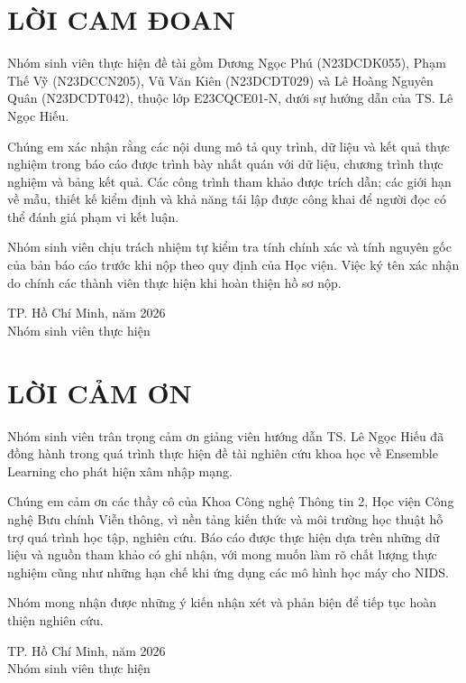 \chapter*{LỜI CAM ĐOAN}
Nhóm sinh viên thực hiện đề tài gồm Dương Ngọc Phú (N23DCDK055), Phạm Thế Vỹ (N23DCCN205), Vũ Văn Kiên (N23DCDT029) và Lê Hoàng Nguyên Quân (N23DCDT042), thuộc lớp E23CQCE01-N, dưới sự hướng dẫn của TS. Lê Ngọc Hiếu.

Chúng em xác nhận rằng các nội dung mô tả quy trình, dữ liệu và kết quả thực nghiệm trong báo cáo được trình bày nhất quán với dữ liệu, chương trình thực nghiệm và bảng kết quả. Các công trình tham khảo được trích dẫn; các giới hạn về mẫu, thiết kế kiểm định và khả năng tái lập được công khai để người đọc có thể đánh giá phạm vi kết luận.

Nhóm sinh viên chịu trách nhiệm tự kiểm tra tính chính xác và tính nguyên gốc của bản báo cáo trước khi nộp theo quy định của Học viện. Việc ký tên xác nhận do chính các thành viên thực hiện khi hoàn thiện hồ sơ nộp.

\vspace{1.8cm}
\begin{flushright}
TP. Hồ Chí Minh, năm 2026\\[10pt]
Nhóm sinh viên thực hiện
\end{flushright}

\clearpage
\chapter*{LỜI CẢM ƠN}
Nhóm sinh viên trân trọng cảm ơn giảng viên hướng dẫn TS. Lê Ngọc Hiếu đã đồng hành trong quá trình thực hiện đề tài nghiên cứu khoa học về Ensemble Learning cho phát hiện xâm nhập mạng.

Chúng em cảm ơn các thầy cô của Khoa Công nghệ Thông tin 2, Học viện Công nghệ Bưu chính Viễn thông, vì nền tảng kiến thức và môi trường học thuật hỗ trợ quá trình học tập, nghiên cứu. Báo cáo được thực hiện dựa trên những dữ liệu và nguồn tham khảo có ghi nhận, với mong muốn làm rõ chất lượng thực nghiệm cũng như những hạn chế khi ứng dụng các mô hình học máy cho NIDS.

Nhóm mong nhận được những ý kiến nhận xét và phản biện để tiếp tục hoàn thiện nghiên cứu.

\vspace{1.8cm}
\begin{flushright}
TP. Hồ Chí Minh, năm 2026\\[10pt]
Nhóm sinh viên thực hiện
\end{flushright}
